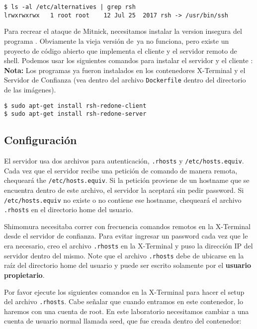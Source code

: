 \begin{lstlisting}
$ ls -al /etc/alternatives | grep rsh
lrwxrwxrwx   1 root root    12 Jul 25  2017 rsh -> /usr/bin/ssh
\end{lstlisting}

Para recrear el ataque de Mitnick, necesitamos instalar la version insegura del programa \rsh. Obviamente la vieja versión de\ \rsh ya no funciona, pero existe un proyecto de código abierto que implementa el cliente y el servidor remoto de shell.
Podemos usar los siguientes comandos para instalar el servidor y el cliente \rsh:
\textbf{Nota:} Los programas \rsh ya fueron instalados en los contenedores X-Terminal y el Servidor de Confianza (vea dentro del archivo \texttt{Dockerfile} dentro del directorio de las imágenes).

\begin{lstlisting}
$ sudo apt-get install rsh-redone-client
$ sudo apt-get install rsh-redone-server
\end{lstlisting}




\subsection{Configuración}
\label{subsec:configuration}

El servidor \rsh usa dos archivos para autenticación, \texttt{.rhosts} y \texttt{/etc/hosts.equiv}.
Cada vez que el servidor recibe una petición de comando de manera remota, chequeará the \texttt{/etc/hosts.equiv}. Si la petición proviene de un hostname que se encuentra dentro de este archivo, el servidor la aceptará sin pedir password.
Si  \texttt{/etc/hosts.equiv} no existe o no contiene ese hostname, \rsh chequeará el archivo \texttt{.rhosts} en el directorio home del usuario.

Shimomura necesitaba correr con frecuencia comandos remotos en la X-Terminal desde el servidor de confianza. Para evitar ingresar un password cada vez que le era necesario, creo el archivo \texttt{.rhosts} en la X-Terminal y puso la dirección IP del servidor dentro del mismo.
Note que el archivo \texttt{.rhosts} debe de ubicarse en la raíz del directorio home del usuario y puede ser escrito solamente por el \textbf{usuario propietario}.

Por favor ejecute los siguientes comandos en la X-Terminal para hacer el setup del archivo \texttt{.rhosts}.
Cabe señalar que cuando entramos en este contenedor, lo haremos con una cuenta de root. En este laboratorio necesitamos cambiar a una cuenta de usuario normal llamada seed, que fue creada dentro del contenedor:


